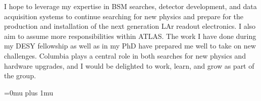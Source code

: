 \documentclass[a4paper]{article}
\begin{document}



I hope to leverage my expertise in BSM searches, detector development, and data acquisition systems to continue searching for new physics and
prepare for the production and installation of the next generation LAr readout electronics.
I also aim to assume more responsibilities within ATLAS. The work I have done
during my DESY fellowship as well as in my PhD have prepared me well to take on new challenges.
Columbia plays a central role in both searches for new physics and hardware upgrades, and I would be delighted to work,
learn, and grow as part of the group.





\Urlmuskip=0mu plus 1mu\relax
{%
\fontsize{11}{14}
\selectfont
}{}

\end{document}
